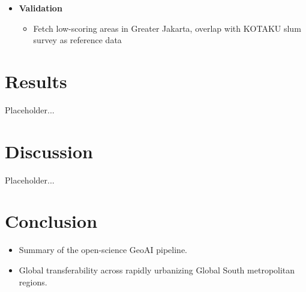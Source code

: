 \documentclass[11pt,a4paper]{article}
\begin{document}
\begin{itemize}[leftmargin=*]
    \begin{itemize}
        \item What kind of living standard do we have for each pixel? Need machine learning-based clustering method
        \item Possible to calculate something like a local palma or gini ratio for inequality analysis? Maybe, but optional
    \end{itemize}
    \item \textbf{Validation}
    \begin{itemize}
        \item Fetch low-scoring areas in Greater Jakarta, overlap with KOTAKU slum survey as reference data
    \end{itemize}
\end{itemize}

\section{Results}
Placeholder...

\section{Discussion}
Placeholder...

\section{Conclusion}
\begin{itemize}[leftmargin=*]
    \item Summary of the open-science GeoAI pipeline.
    \item Global transferability across rapidly urbanizing Global South metropolitan regions.
\end{itemize}
\end{document}

